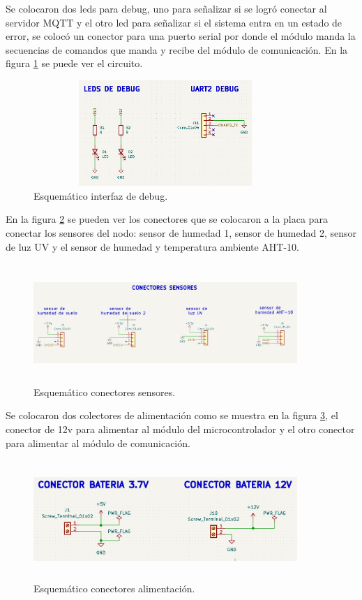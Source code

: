 Se colocaron dos leds para debug, uno para señalizar si se logró conectar al servidor MQTT y el otro led para señalizar si el sistema entra en un estado de error, se colocó un conector para una puerto serial por donde el módulo manda la secuencias de comandos que manda y recibe del módulo de comunicación. En la figura \ref{fig:esquematico conectores de debug} se puede ver el circuito.
\begin{figure}[h!]
  \centering
	\includegraphics[width=10cm, height=4cm]{./Figures/esquematico_debug.png}
	\caption{Esquemático interfaz de debug.}
	\label{fig:esquematico conectores de debug}
\end{figure}

En la figura \ref{fig:esquematico conectores sensores} se pueden ver los conectores que se colocaron a la placa para conectar los sensores del nodo: sensor de humedad 1, sensor de humedad 2, sensor de luz UV y el sensor de humedad y temperatura ambiente AHT-10.
\begin{figure}[h]
  \centering
	\includegraphics[width=10cm, height=4.5cm]{./Figures/esquematico_conectores_sensores.png}
	\caption{Esquemático conectores sensores.}
	\label{fig:esquematico conectores sensores}
\end{figure}

Se colocaron dos colectores de alimentación como se muestra en la figura \ref{fig:esquematico conectores alimentacion}, el conector de 12v para alimentar al módulo del microcontrolador y el otro conector para alimentar al módulo de comunicación.
\begin{figure}[h]
  \centering
	\includegraphics[width=10cm, height=4.5cm]{./Figures/esquematico_alimentacion.png}
	\caption{Esquemático conectores alimentación.}
	\label{fig:esquematico conectores alimentacion}
\end{figure}

